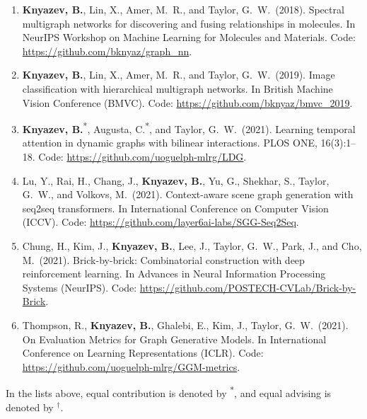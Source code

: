 \begin{enumerate}
    \item \textbf{Knyazev, B.}, Lin, X., Amer, M.~R., and Taylor, G.~W.~(2018). Spectral multigraph networks for discovering and fusing relationships in molecules. In NeurIPS Workshop on Machine Learning for Molecules and Materials.
    Code: \url{https://github.com/bknyaz/graph_nn}.
    
    \item \textbf{Knyazev, B.}, Lin, X., Amer, M.~R., and Taylor, G.~W.~(2019). Image classification with hierarchical multigraph networks. In British Machine Vision Conference (BMVC). %
    Code: \url{https://github.com/bknyaz/bmvc_2019}.
    
    \item \textbf{Knyazev, B.}\textsuperscript{*}, Augusta, C.\textsuperscript{*}, and Taylor, G.~W.~(2021). Learning temporal attention in dynamic graphs with bilinear interactions. PLOS ONE, 16(3):1–18.
    Code: \url{https://github.com/uoguelph-mlrg/LDG}.
    
    \item Lu, Y., Rai, H., Chang, J., \textbf{Knyazev, B.}, Yu, G., Shekhar, S., Taylor, G.~W., and Volkovs, M.~(2021). Context-aware scene graph generation with seq2seq transformers. In International Conference on Computer Vision (ICCV).
    Code: \url{https://github.com/layer6ai-labs/SGG-Seq2Seq}.
    
    \item Chung, H., Kim, J., \textbf{Knyazev, B.}, Lee, J., Taylor, G.~W., Park, J., and Cho, M.~(2021). Brick-by-brick: Combinatorial construction with deep reinforcement learning. In Advances in Neural Information Processing Systems (NeurIPS).
    Code: \url{https://github.com/POSTECH-CVLab/Brick-by-Brick}.
    
    
    \item Thompson, R., \textbf{Knyazev, B.}, Ghalebi, E., Kim, J., Taylor, G.~W.~(2021). On Evaluation Metrics for Graph Generative Models. In International Conference on Learning Representations (ICLR). 
    Code: \url{https://github.com/uoguelph-mlrg/GGM-metrics}.
    
    
\end{enumerate}

\noindent In the lists above, equal contribution is denoted by \textsuperscript{*}, and equal advising is denoted by $^\dagger$.